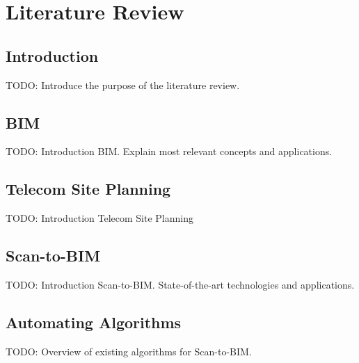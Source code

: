 \chapter{Literature Review}
\label{sec:literature_review}

\section{Introduction}
TODO: Introduce the purpose of the literature review.

\section{BIM}
TODO: Introduction BIM. Explain most relevant concepts and applications.

\section{Telecom Site Planning}
TODO: Introduction Telecom Site Planning

\section{Scan-to-BIM}
TODO: Introduction Scan-to-BIM. State-of-the-art technologies and applications.

\section{Automating Algorithms}
TODO: Overview of existing algorithms for Scan-to-BIM.